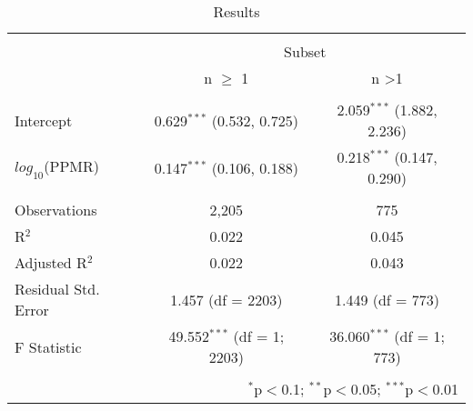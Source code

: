 
\begin{table}[!htbp] \centering 
  \caption{Results} 
  \label{tab:n-ppmr} 
\begin{tabular}{@{\extracolsep{5pt}}lcc} 
\\[-1.8ex]\hline 
\hline \\[-1.8ex] 
 & \multicolumn{2}{c}{Subset} \\ 
\cline{2-3} 
 & n $\geq$ 1 & n \textgreater 1 \\ 
\hline \\[-1.8ex] 
 Intercept & 0.629$^{***}$ (0.532, 0.725) & 2.059$^{***}$ (1.882, 2.236) \\ 
  $log_{10}$(PPMR) & 0.147$^{***}$ (0.106, 0.188) & 0.218$^{***}$ (0.147, 0.290) \\ 
 \hline \\[-1.8ex] 
Observations & 2,205 & 775 \\ 
R$^{2}$ & 0.022 & 0.045 \\ 
Adjusted R$^{2}$ & 0.022 & 0.043 \\ 
Residual Std. Error & 1.457 (df = 2203) & 1.449 (df = 773) \\ 
F Statistic & 49.552$^{***}$ (df = 1; 2203) & 36.060$^{***}$ (df = 1; 773) \\ 
\hline 
\hline \\[-1.8ex] 
\multicolumn{3}{r}{$^{*}$p$<$0.1; $^{**}$p$<$0.05; $^{***}$p$<$0.01} \\ 
\end{tabular} 
\end{table} 
